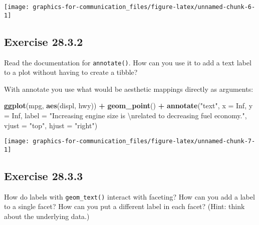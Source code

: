 \documentclass[]{book}
\newenvironment{Shaded}{\begin{snugshade}}{\end{snugshade}}
\newcommand{\CharTok}[1]{\textcolor[rgb]{0.31,0.60,0.02}{#1}}
\newcommand{\DataTypeTok}[1]{\textcolor[rgb]{0.13,0.29,0.53}{#1}}
\newcommand{\KeywordTok}[1]{\textcolor[rgb]{0.13,0.29,0.53}{\textbf{#1}}}
\newcommand{\NormalTok}[1]{#1}
\newcommand{\OperatorTok}[1]{\textcolor[rgb]{0.81,0.36,0.00}{\textbf{#1}}}
\newcommand{\OtherTok}[1]{\textcolor[rgb]{0.56,0.35,0.01}{#1}}
\newcommand{\StringTok}[1]{\textcolor[rgb]{0.31,0.60,0.02}{#1}}
\theoremstyle{plain}
\theoremstyle{remark}
\begin{document}
\begin{center}\texttt{[image: graphics-for-communication\_files/figure-latex/unnamed-chunk-6-1]} \end{center}

\hypertarget{exercise-28.3.2}{%
\subsection*{\texorpdfstring{Exercise
{28.3.2}}{Exercise 28.3.2}}\label{exercise-28.3.2}}

Read the documentation for \texttt{annotate()}. How can you use it to
add a text label to a plot without having to create a tibble?

With annotate you use what would be aesthetic mappings directly as
arguments:

\begin{Shaded}
\begin{Highlighting}[]
\KeywordTok{ggplot}\NormalTok{(mpg, }\KeywordTok{aes}\NormalTok{(displ, hwy)) }\OperatorTok{+}
\StringTok{  }\KeywordTok{geom_point}\NormalTok{() }\OperatorTok{+}
\StringTok{  }\KeywordTok{annotate}\NormalTok{(}\StringTok{"text"}\NormalTok{, }\DataTypeTok{x =} \OtherTok{Inf}\NormalTok{, }\DataTypeTok{y =} \OtherTok{Inf}\NormalTok{,}
           \DataTypeTok{label =} \StringTok{"Increasing engine size is }\CharTok{\textbackslash{}n}\StringTok{related to decreasing fuel economy."}\NormalTok{, }\DataTypeTok{vjust =} \StringTok{"top"}\NormalTok{, }\DataTypeTok{hjust =} \StringTok{"right"}\NormalTok{)}
\end{Highlighting}
\end{Shaded}

\begin{center}\texttt{[image: graphics-for-communication\_files/figure-latex/unnamed-chunk-7-1]} \end{center}

\hypertarget{exercise-28.3.3}{%
\subsection*{\texorpdfstring{Exercise
{28.3.3}}{Exercise 28.3.3}}\label{exercise-28.3.3}}

How do labels with \texttt{geom\_text()} interact with faceting? How can
you add a label to a single facet? How can you put a different label in
each facet? (Hint: think about the underlying data.)
\end{document}
